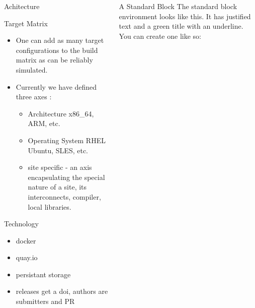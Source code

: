 \documentclass[final]{beamer}
\newlength{\onecolwid}
\begin{document}
\begin{frame}[t]
\begin{columns}[t]
\begin{column}{\onecolwid}
\begin{block}{Achitecture}
         \end{block}
         \begin{block}{Target Matrix}
             \begin{itemize}
                 \item One can add as many target configurations to the build matrix as can be reliably simulated.
                 \item Currently we have defined three axes :
                 \begin{itemize}
                    \item Architecture x86\_64, ARM, etc.
                    \item Operating System RHEL Ubuntu, SLES, etc.
                    \item site specific - an axis encapsulating the special nature of a site, its interconnects, compiler, local libraries.
                 \end{itemize} 
             \end{itemize}
        \end{block}
         \begin{block}{Technology}
             \begin{itemize}
                 \item docker
                 \item quay.io
                 \item persistant storage
                 \item releases get a doi, authors are submitters and PR
             \end{itemize}
         \end{block}
    \end{column}
    \begin{column}{\onecolwid}
      \begin{block}{A Standard Block}
        The standard block environment looks like this. It has justified text and a green title with an underline. You can create one like so:
      \end{block}

\end{column}
\end{columns}
\end{frame}
\end{document}
